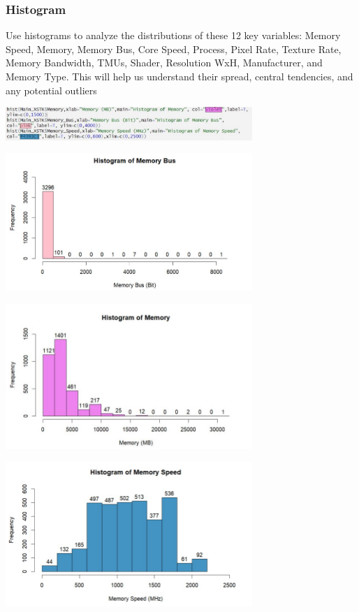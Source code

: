 \subsubsection{Histogram}
\tab Use histograms to analyze the distributions of these 12 key variables: Memory Speed, Memory, Memory Bus, Core Speed, Process, Pixel Rate, Texture Rate, Memory Bandwidth, TMUs, Shader, Resolution WxH, Manufacturer, and Memory Type. This will help us understand their spread, central tendencies, and any potential outliers

\begin{center}
    \includegraphics[width=0.7\textwidth]{sk.png}
\end{center}
\begin{center}
    \includegraphics[width=0.7\textwidth]{membush.png}
\end{center}
\begin{center}
    \includegraphics[width=0.7\textwidth]{memh.png}
\end{center}
\begin{center}
    \includegraphics[width=0.7\textwidth]{memspeed.png}
\end{center}

